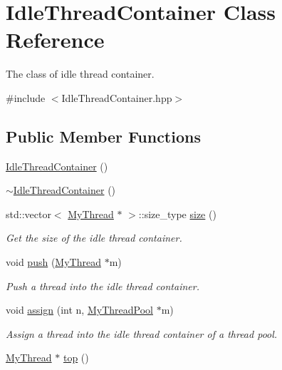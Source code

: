\hypertarget{classIdleThreadContainer}{}\section{Idle\+Thread\+Container Class Reference}
\label{classIdleThreadContainer}


The class of idle thread container.  




{\ttfamily \#include $<$Idle\+Thread\+Container.\+hpp$>$}

\subsection*{Public Member Functions}
\begin{DoxyCompactItemize}
\item 
\hyperlink{classIdleThreadContainer_a83d8818aa23117b2988cf5983196aff7}{Idle\+Thread\+Container} ()
\item 
\hyperlink{classIdleThreadContainer_a62e8c40ae681cc19c8a77c5905e63b91}{$\sim$\+Idle\+Thread\+Container} ()
\item 
std\+::vector$<$ \hyperlink{classMyThread}{My\+Thread} $\ast$ $>$\+::size\+\_\+type \hyperlink{classIdleThreadContainer_a5b1b0dbbcd69816ed8f4a9b117428536}{size} ()
\begin{DoxyCompactList}\small\item\em Get the size of the idle thread container. \end{DoxyCompactList}\item 
void \hyperlink{classIdleThreadContainer_a3874126045ab92244f7489439f9a28ee}{push} (\hyperlink{classMyThread}{My\+Thread} $\ast$m)
\begin{DoxyCompactList}\small\item\em Push a thread into the idle thread container. \end{DoxyCompactList}\item 
void \hyperlink{classIdleThreadContainer_a4165535fed8aa4c36b9327b9c58d951b}{assign} (int n, \hyperlink{classMyThreadPool}{My\+Thread\+Pool} $\ast$m)
\begin{DoxyCompactList}\small\item\em Assign a thread into the idle thread container of a thread pool. \end{DoxyCompactList}\item 
\hyperlink{classMyThread}{My\+Thread} $\ast$ \hyperlink{classIdleThreadContainer_a8df6ccc5fb9d17e47cfd74e75ab1af96}{top} ()

\end{DoxyCompactItemize}
